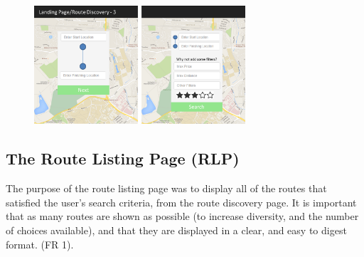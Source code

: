 \documentclass[a4paper,twoside,notitlepage,11pt]{article}
\begin{document}
\begin{figure}[!ht]
	\begin{center}
		\includegraphics[width=0.70\textwidth]{images/ui-landing-3.png}
	\end{center}
	\vspace{-10mm}
\end{figure}

\newpage 
\subsection{The Route Listing Page (RLP)}
The purpose of the route listing page was to display all of the routes that satisfied the user's search criteria, from the route discovery page. It is important that as many routes are shown as possible (to increase diversity, and the number of choices available), and that they are displayed in a clear, and easy to digest format. (FR 1).
\end{document}

